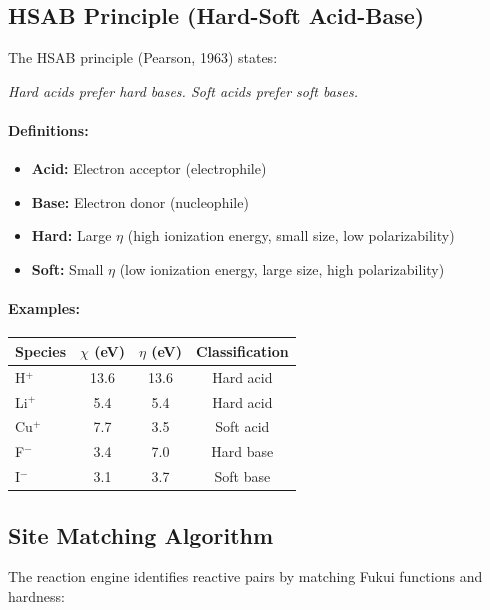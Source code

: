 \documentclass[11pt]{article}
\begin{document}
\subsection{HSAB Principle (Hard-Soft Acid-Base)}

The HSAB principle (Pearson, 1963) states:

\begin{center}
\textit{Hard acids prefer hard bases. Soft acids prefer soft bases.}
\end{center}

\paragraph{Definitions:}
\begin{itemize}
\item \textbf{Acid:} Electron acceptor (electrophile)
\item \textbf{Base:} Electron donor (nucleophile)
\item \textbf{Hard:} Large $\eta$ (high ionization energy, small size, low polarizability)
\item \textbf{Soft:} Small $\eta$ (low ionization energy, large size, high polarizability)
\end{itemize}

\paragraph{Examples:}
\begin{center}
\begin{tabular}{lccc}
\toprule
Species & $\chi$ (eV) & $\eta$ (eV) & Classification \\
\midrule
H$^+$ & 13.6 & 13.6 & Hard acid \\
Li$^+$ & 5.4 & 5.4 & Hard acid \\
Cu$^+$ & 7.7 & 3.5 & Soft acid \\
F$^-$ & 3.4 & 7.0 & Hard base \\
I$^-$ & 3.1 & 3.7 & Soft base \\
\bottomrule
\end{tabular}
\end{center}

\subsection{Site Matching Algorithm}

The reaction engine identifies reactive pairs by matching Fukui functions and hardness:
\end{document}
